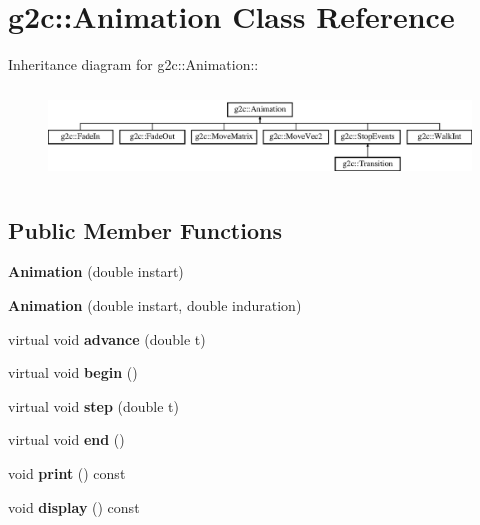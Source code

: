 \hypertarget{classg2c_1_1_animation}{
\section{g2c::Animation Class Reference}
\label{classg2c_1_1_animation}
}
Inheritance diagram for g2c::Animation::\begin{figure}[H]
\begin{center}
\leavevmode
\includegraphics[height=2.45614cm]{classg2c_1_1_animation}
\end{center}
\end{figure}
\subsection*{Public Member Functions}
\begin{DoxyCompactItemize}
\item 
\hypertarget{classg2c_1_1_animation_a46ca60d97faa981cda59578cf1c5734c}{
{\bfseries Animation} (double instart)}
\label{classg2c_1_1_animation_a46ca60d97faa981cda59578cf1c5734c}

\item 
\hypertarget{classg2c_1_1_animation_a36e4196bfb5c1955ce750f884a741f43}{
{\bfseries Animation} (double instart, double induration)}
\label{classg2c_1_1_animation_a36e4196bfb5c1955ce750f884a741f43}

\item 
\hypertarget{classg2c_1_1_animation_a73d21f972a7c1f5af536d827fad8d3a8}{
virtual void {\bfseries advance} (double t)}
\label{classg2c_1_1_animation_a73d21f972a7c1f5af536d827fad8d3a8}

\item 
\hypertarget{classg2c_1_1_animation_aa271ceea2dbdb48b9a7ae43353c20cd6}{
virtual void {\bfseries begin} ()}
\label{classg2c_1_1_animation_aa271ceea2dbdb48b9a7ae43353c20cd6}

\item 
\hypertarget{classg2c_1_1_animation_ad05117579bf2e2d3d0c698c0b4b8596b}{
virtual void {\bfseries step} (double t)}
\label{classg2c_1_1_animation_ad05117579bf2e2d3d0c698c0b4b8596b}

\item 
\hypertarget{classg2c_1_1_animation_a53c2192f9b61c2d01c0651e0c239a68e}{
virtual void {\bfseries end} ()}
\label{classg2c_1_1_animation_a53c2192f9b61c2d01c0651e0c239a68e}

\item 
\hypertarget{classg2c_1_1_animation_a6e2f9faea125f0e604d374002a46e5d4}{
void {\bfseries print} () const }
\label{classg2c_1_1_animation_a6e2f9faea125f0e604d374002a46e5d4}

\item 
\hypertarget{classg2c_1_1_animation_ad4ae05fdbb106c726055109baf8c55ad}{
void {\bfseries display} () const }
\label{classg2c_1_1_animation_ad4ae05fdbb106c726055109baf8c55ad}

\end{DoxyCompactItemize}

